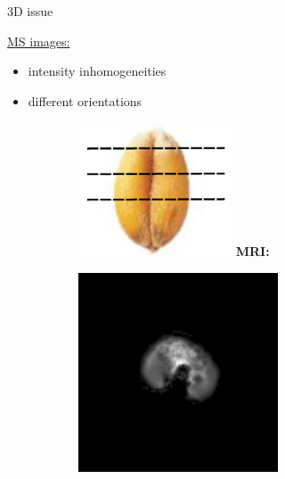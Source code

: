 \documentclass[10pt]{beamer}
\begin{document}
\begin{frame}{3D issue}
  
  \underline{MS images:}%
      \begin{itemize}
      \item intensity inhomogeneities
      \item different orientations
      \end{itemize}

  

  \vspace{-0.3cm}
  \begin{figure}[ht]
    \centering
    \begin{subfigure}[b]{0.15\textwidth}
      \includegraphics[width=0.5\textwidth]{fig/cutwheatgrain}
       \textbf{MRI:}
     \end{subfigure}%
     \begin{subfigure}[c]{0.3\textwidth}
       \centering
       \includegraphics[width=0.65\textwidth]{fig/3D_density_aligned_manual0000}%
     \end{subfigure}%
     \begin{subfigure}[c]{0.3\textwidth}
       \centering

\end{subfigure}
\end{figure}
\end{frame}
\end{document}
